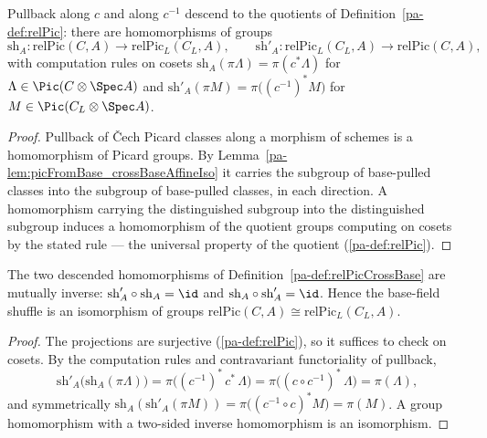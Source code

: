 \begin{definition}
  \label{pa-def:relPicCrossBase}
  \leanok

  Pullback along \(c\) and along \(c^{-1}\) descend to the quotients of
  Definition~\ref{pa-def:relPic}: there are homomorphisms of groups
  \[
    \mathrm{sh}_A : \mathrm{relPic}(C,A) \longrightarrow \mathrm{relPic}_L(C_L, A),
    \qquad
    \mathrm{sh}'_A : \mathrm{relPic}_L(C_L, A) \longrightarrow \mathrm{relPic}(C,A),
  \]
  with computation rules on cosets
  \(\mathrm{sh}_A(\pi \Lambda) = \pi(c^{*} \Lambda)\) for
  \(\Lambda \in \Pic(C \otimes \Spec A)\) and
  \(\mathrm{sh}'_A(\pi M) = \pi\bigl((c^{-1})^{*} M\bigr)\) for
  \(M \in \Pic(C_L \otimes \Spec A)\).
\end{definition}
\begin{proof}
  \leanok
  Pullback of \v Cech Picard classes along a morphism of schemes is a homomorphism of
  Picard groups. By Lemma~\ref{pa-lem:picFromBase_crossBaseAffineIso} it carries the
  subgroup of base-pulled classes into the subgroup of base-pulled classes, in each
  direction. A homomorphism carrying the distinguished subgroup into the distinguished
  subgroup induces a homomorphism of the quotient groups computing on cosets by the
  stated rule --- the universal property of the quotient (\ref{pa-def:relPic}).
\end{proof}

\begin{theorem}
  \label{pa-thm:relPicCrossBaseEquiv}
  \leanok

  The two descended homomorphisms of Definition~\ref{pa-def:relPicCrossBase} are mutually
  inverse: \(\mathrm{sh}'_A \circ \mathrm{sh}_A = \id\) and
  \(\mathrm{sh}_A \circ \mathrm{sh}'_A = \id\). Hence the base-field shuffle is an
  isomorphism of groups
  \(\mathrm{relPic}(C,A) \cong \mathrm{relPic}_L(C_L, A)\).
\end{theorem}
\begin{proof}
  \leanok
  The projections are surjective (\ref{pa-def:relPic}), so it suffices to check on
  cosets. By the computation rules and contravariant functoriality of pullback,
  \[
    \mathrm{sh}'_A\bigl(\mathrm{sh}_A(\pi \Lambda)\bigr)
      = \pi\bigl((c^{-1})^{*}\, c^{*}\, \Lambda\bigr)
      = \pi\bigl((c \circ c^{-1})^{*}\, \Lambda\bigr)
      = \pi(\Lambda),
  \]
  and symmetrically \(\mathrm{sh}_A(\mathrm{sh}'_A(\pi M)) =
  \pi\bigl((c^{-1} \circ c)^{*} M\bigr) = \pi(M)\). A group homomorphism with a
  two-sided inverse homomorphism is an isomorphism.
\end{proof}

